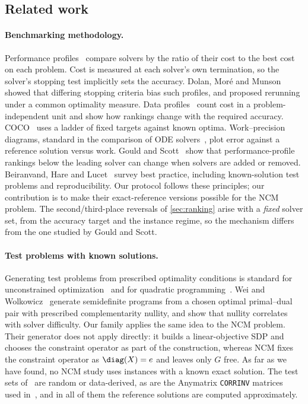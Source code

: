 \subsection{Related work}\label{sec:related}

\paragraph{Benchmarking methodology.}
Performance profiles~\cite{dolan2002benchmarking} compare solvers by the ratio
of their cost to the best cost on each problem. Cost is measured at each
solver's own termination, so the solver's stopping test implicitly sets the
accuracy. Dolan, Mor\'e and Munson~\cite{dolan2006optimality} showed that
differing stopping criteria bias such profiles, and proposed rerunning under a
common optimality measure. Data profiles~\cite{more2009benchmarking} count
cost in a problem-independent unit and show how rankings change with the
required accuracy. COCO~\cite{hansen2021coco} uses a ladder of fixed targets
against known optima. Work--precision diagrams, standard in the comparison of
ODE solvers~\cite{hairer1996solving}, plot error against a reference solution
versus work. Gould and Scott~\cite{gould2016note} show that performance-profile
rankings below the leading solver can change when solvers are added or
removed. Beiranvand, Hare and Lucet~\cite{beiranvand2017best} survey best
practice, including known-solution test problems and reproducibility. Our
protocol follows these principles; our contribution is to make their
exact-reference versions possible for the NCM problem. The second/third-place
reversals of \cref{sec:ranking} arise with a \emph{fixed} solver set, from the
accuracy target and the instance regime, so the mechanism differs from the one
studied by Gould and Scott.

\paragraph{Test problems with known solutions.}
Generating test problems from prescribed optimality conditions is standard
for unconstrained optimization~\cite{more1981testing} and for quadratic
programming~\cite{lenard1984randomly,calamai1993new}. Wei and
Wolkowicz~\cite{wei2010generating} generate semidefinite programs from a
chosen optimal primal--dual pair with prescribed complementarity nullity, and
show that nullity correlates with solver difficulty. Our family applies the
same idea to the NCM problem. Their generator does not apply directly: it
builds a linear-objective SDP and chooses the constraint operator as part of
the construction, whereas NCM fixes the constraint operator as $\diag(X)=e$
and leaves only $G$ free. As far as we have found, no NCM study uses
instances with a known exact solution. The test sets
of~\cite{higham2002nearest,qisun2006quadratically,borsdorf2007newton,borsdorf2010preconditioned,higham2016anderson,armijo2025semismooth}
are random or data-derived, as are the Anymatrix \texttt{CORRINV}
matrices~\cite{higham2022anymatrix} used in~\cite{huynh2025accelerated}, and
in all of them the reference solutions are computed approximately.

